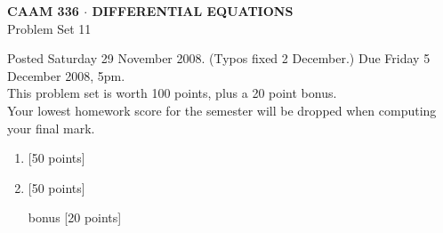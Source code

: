 \documentclass[10pt]{article}
\begin{document}
\begin{center}
\large \textsf{\textbf{CAAM 336 $\cdot$ DIFFERENTIAL EQUATIONS}\\[0.5em]
 Problem Set 11 }
\end{center}

Posted Saturday 29 November 2008.  (Typos fixed 2 December.) Due Friday 5 December 2008, 5pm.\\
This problem set is worth 100 points, plus a 20 point bonus.\\
Your lowest homework score for the semester will be dropped when 
computing your final mark.
\begin{enumerate}

\item {[50 points]}\\ 

\item {[50 points]}\\ 

\item[bonus] {[20 points]}\\ 

\end{enumerate}
\end{document}

